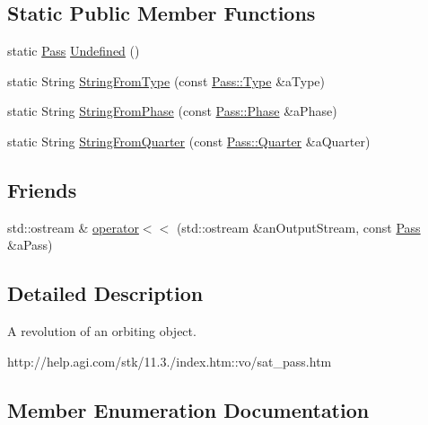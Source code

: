 \subsection*{Static Public Member Functions}
\begin{DoxyCompactItemize}
\item 
static \hyperlink{classlibrary_1_1astro_1_1trajectory_1_1orbit_1_1_pass}{Pass} \hyperlink{classlibrary_1_1astro_1_1trajectory_1_1orbit_1_1_pass_a404433c99e31d1ab9e28e3fdd13ed221}{Undefined} ()
\item 
static String \hyperlink{classlibrary_1_1astro_1_1trajectory_1_1orbit_1_1_pass_ab7983b8918e73295ba33ab80892a06c4}{String\+From\+Type} (const \hyperlink{classlibrary_1_1astro_1_1trajectory_1_1orbit_1_1_pass_aa2a63a39c759bf96a0cc62a6ed3d2ceb}{Pass\+::\+Type} \&a\+Type)
\item 
static String \hyperlink{classlibrary_1_1astro_1_1trajectory_1_1orbit_1_1_pass_a4f87794fff0cd35d242c73a5cf8ce838}{String\+From\+Phase} (const \hyperlink{classlibrary_1_1astro_1_1trajectory_1_1orbit_1_1_pass_ae0ff0630d4ad5cd97aa3efbc8c8f368b}{Pass\+::\+Phase} \&a\+Phase)
\item 
static String \hyperlink{classlibrary_1_1astro_1_1trajectory_1_1orbit_1_1_pass_a4c00ed82189f0dd1fba4d1147e916e1e}{String\+From\+Quarter} (const \hyperlink{classlibrary_1_1astro_1_1trajectory_1_1orbit_1_1_pass_a70c718878e83f059e65788c323eb7900}{Pass\+::\+Quarter} \&a\+Quarter)
\end{DoxyCompactItemize}
\subsection*{Friends}
\begin{DoxyCompactItemize}
\item 
std\+::ostream \& \hyperlink{classlibrary_1_1astro_1_1trajectory_1_1orbit_1_1_pass_a62c2257085205d3c714c5ca4350f84f4}{operator$<$$<$} (std\+::ostream \&an\+Output\+Stream, const \hyperlink{classlibrary_1_1astro_1_1trajectory_1_1orbit_1_1_pass}{Pass} \&a\+Pass)
\end{DoxyCompactItemize}


\subsection{Detailed Description}
A revolution of an orbiting object. 

http\+://help.agi.\+com/stk/11.3./index.htm\+::vo/sat\+\_\+pass.htm 

\subsection{Member Enumeration Documentation}
\mbox{\label{classlibrary_1_1astro_1_1trajectory_1_1orbit_1_1_pass_ae0ff0630d4ad5cd97aa3efbc8c8f368b}} 
